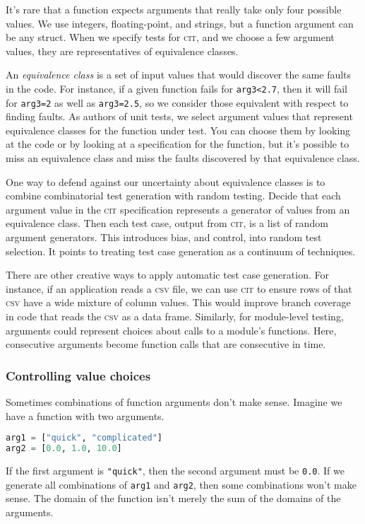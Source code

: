 \documentclass{juliacon}
\newcommand{\cit}{\textsc{cit}\xspace}
\newcommand{\csv}{\textsc{csv}\xspace}
\begin{document}
\vskip 6pt
It's rare that a function expects arguments that really take only four possible values. We use integers, floating-point, and strings, but a function argument can be any struct. When we specify tests for \cit, and we choose a few argument values, they are representatives of equivalence classes.

\vskip 6pt
An \emph{equivalence class} is a set of input values that would discover the same faults in the code. For instance, if a given function fails for \verb|arg3<2.7|, then it will fail for \verb|arg3=2| as well as \verb|arg3=2.5|, so we consider those equivalent with respect to finding faults. As authors of unit tests, we select argument values that represent equivalence classes for the function under test. You can choose them by looking at the code or by looking at a specification for the function, but it's possible to miss an equivalence class and miss the faults discovered by that equivalence class.

\vskip 6pt
One way to defend against our uncertainty about equivalence classes is to combine combinatorial test generation with random testing. Decide that each argument value in the \cit specification represents a generator of values from an equivalence class. Then each test case, output from \cit, is a list of random argument generators. This introduces bias, and control, into random test selection. It points to treating test case generation as a continuum of techniques.

\vskip 6pt
There are other creative ways to apply automatic test case generation. For instance, if an application reads a \csv file, we can use \cit to ensure rows of that \csv have a wide mixture of column values. This would improve branch coverage in code that reads the \csv as a data frame. Similarly, for module-level testing, arguments could represent choices about calls to a module's functions. Here, consecutive arguments become function calls that are consecutive in time.


\subsubsection{Controlling value choices}

Sometimes combinations of function arguments don't make sense. Imagine we have a function with two arguments.
\begin{lstlisting}[language=Julia]
arg1 = ["quick", "complicated"]
arg2 = [0.0, 1.0, 10.0]
\end{lstlisting}
If the first argument is \verb|"quick"|, then the second argument must be \verb|0.0|. If we generate all combinations of \verb|arg1| and \verb|arg2|, then some combinations won't make sense. The domain of the function isn't merely the sum of the domains of the arguments.
\end{document}
